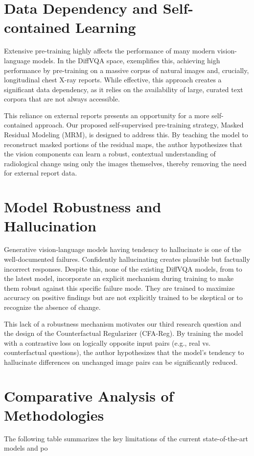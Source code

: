 \section{Data Dependency and Self-contained Learning}
Extensive pre-training highly affects the performance of many modern vision-language models. In the DiffVQA space, \cite{plural} exemplifies this, achieving high performance by pre-training on a massive corpus of natural images and, crucially, longitudinal chest X-ray reports. While effective, this approach creates a significant data dependency, as it relies on the availability of large, curated text corpora that are not always accessible.

This reliance on external reports presents an opportunity for a more self-contained approach. Our proposed self-supervised pre-training strategy, Masked Residual Modeling (MRM), is designed to address this. By teaching the model to reconstruct masked portions of the residual maps, the author hypothesizes that the vision components can learn a robust, contextual understanding of radiological change using only the images themselves, thereby removing the need for external report data.

\section{Model Robustness and Hallucination}
Generative vision-language models having tendency to hallucinate is one of the well-documented failures. Confidently hallucinating creates plausible but factually incorrect responses. Despite this, none of the existing DiffVQA models, from \cite{ekaid} to the latest \cite{encoder-decoder} model, incorporate an explicit mechanism during training to make them robust against this specific failure mode. They are trained to maximize accuracy on positive findings but are not explicitly trained to be skeptical or to recognize the absence of change.

This lack of a robustness mechanism motivates our third research question and the design of the Counterfactual Regularizer (CFA-Reg). By training the model with a contrastive loss on logically opposite input pairs (e.g., real vs. counterfactual questions), the author hypothesizes that the model's tendency to hallucinate differences on unchanged image pairs can be significantly reduced.

\section{Comparative Analysis of Methodologies}
The following table summarizes the key limitations of the current state-of-the-art models and po

